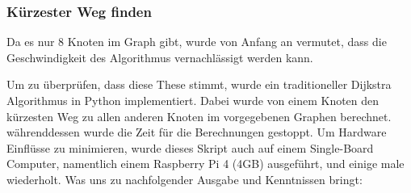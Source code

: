 \subsubsection{Kürzester Weg finden}

Da es nur 8 Knoten im Graph gibt, wurde von Anfang an vermutet, dass die Geschwindigkeit des Algorithmus vernachlässigt werden kann.

Um zu überprüfen, dass diese These stimmt, wurde ein traditioneller Dijkstra Algorithmus in Python implementiert. Dabei wurde von einem Knoten den kürzesten Weg zu allen anderen Knoten im vorgegebenen Graphen berechnet. währenddessen wurde die Zeit für die Berechnungen gestoppt. Um Hardware Einflüsse zu minimieren, wurde dieses Skript auch auf einem Single-Board Computer, namentlich einem Raspberry Pi 4 (4GB) ausgeführt, und einige male wiederholt. Was uns zu nachfolgender Ausgabe und Kenntnissen bringt:

